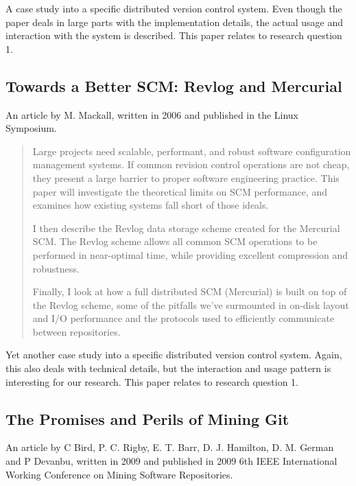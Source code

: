 \documentclass{llncs}
\begin{document}
A case study into a specific distributed version control system. Even
though the paper deals in large parts with the implementation details,
the actual usage and interaction with the system is described. This
paper relates to research question 1.

\subsection{Towards a Better SCM: Revlog and Mercurial}

An article by M. Mackall, written in 2006 and published in the Linux
Symposium.

\begin{abstract}
 Large projects need scalable, performant, and robust software configuration
 management systems. If common revision control operations are not cheap,
 they present a large barrier to proper software engineering practice. This
 paper will investigate the theoretical limits on SCM performance, and
 examines how existing systems fall short of those ideals.

 I then describe the Revlog data storage scheme created for the Mercurial
 SCM. The Revlog scheme allows all common SCM operations to be performed in
 near-optimal time, while providing excellent compression and robustness. 

 Finally, I look at how a full distributed SCM (Mercurial) is built on top
 of the Revlog scheme, some of the pitfalls we've surmounted in on-disk
 layout and I/O performance and the protocols used to efficiently
 communicate between repositories.
\end{abstract}

Yet another case study into a specific distributed version control
system.  Again, this also deals with technical details, but the
interaction and usage pattern is interesting for our research. This
paper relates to research question 1.

\subsection{The Promises and Perils of Mining Git}

An article by C Bird, P. C. Rigby, E. T. Barr, D. J. Hamilton, D. M. German
and P Devanbu, written in 2009 and published in 2009 6th IEEE International 
Working Conference on Mining Software Repositories.
\end{document}
